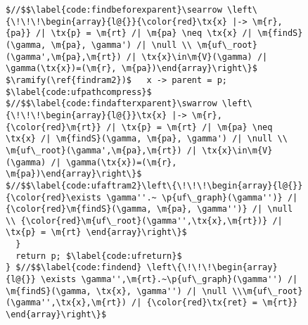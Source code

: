 \begin{figure}[t]
\begin{lstlisting}[multicols=2]
$//$$\label{code:findbeforexparent}\searrow \left\{\!\!\!\begin{array}{l@{}}{\color{red}\tx{x} |-> \m{r},{pa}} /| \tx{p} = \m{rt} /| \m{pa} \neq \tx{x} /| \m{findS}(\gamma, \m{pa}, \gamma') /| \null \\ \m{uf\_root}(\gamma',\m{pa},\m{rt}) /| \tx{x}\in\m{V}(\gamma) /| \gamma(\tx{x})=(\m{r}, \m{pa})\end{array}\right\}$
$\ramify(\ref{findram2})$   x -> parent = p; $\label{code:ufpathcompress}$
$//$$\label{code:findafterxparent}\swarrow \left\{\!\!\!\begin{array}{l@{}}\tx{x} |-> \m{r},{\color{red}\m{rt}} /| \tx{p} = \m{rt} /| \m{pa} \neq \tx{x} /| \m{findS}(\gamma, \m{pa}, \gamma') /| \null \\ \m{uf\_root}(\gamma',\m{pa},\m{rt}) /| \tx{x}\in\m{V}(\gamma) /| \gamma(\tx{x})=(\m{r}, \m{pa})\end{array}\right\}$
$//$$\label{code:ufaftram2}\left\{\!\!\!\begin{array}{l@{}} {\color{red}\exists \gamma''.~ \p{uf\_graph}(\gamma'')} /| {\color{red}\m{findS}(\gamma, \m{pa}, \gamma'')} /| \null \\ {\color{red}\m{uf\_root}(\gamma'',\tx{x},\m{rt})} /| \tx{p} = \m{rt} \end{array}\right\}$
  }
  return p; $\label{code:ufreturn}$
} $//$$\label{code:findend} \left\{\!\!\!\begin{array}{l@{}} \exists \gamma'',\m{rt}.~\p{uf\_graph}(\gamma'') /| \m{findS}(\gamma, \tx{x}, \gamma'') /| \null \\\m{uf\_root}(\gamma'',\tx{x},\m{rt}) /| {\color{red}\tx{ret} = \m{rt}}  \end{array}\right\}$
\end{lstlisting}


\end{figure}

